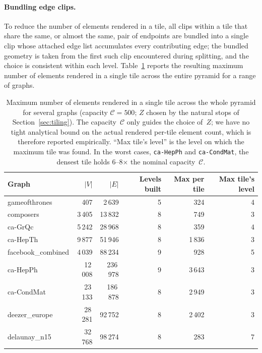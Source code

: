 \paragraph{Bundling edge clips.}
To reduce the number of elements rendered in a tile, all clips within
a tile that share the same, or almost the same, pair of endpoints are
bundled into a single clip whose attached edge list accumulates every
contributing edge; the bundled geometry is taken from the first such
clip encountered during splitting, and the choice is consistent within
each level. Table~\ref{tab:max-per-tile} reports the resulting maximum
number of elements rendered in a single tile across the entire pyramid
for a range of graphs.

\begin{table}[t]
\caption{Maximum number of elements rendered in a single tile across
  the whole pyramid for several graphs (capacity $\mathcal{C}=500$;
  $Z$ chosen by the natural stops of Section~\ref{sec:tiling}). The
  capacity~$\mathcal{C}$ only guides the choice of~$Z$; we have no
  tight analytical bound on the actual rendered per-tile element
  count, which is therefore reported empirically. ``Max tile's level''
  is the level on which the maximum tile was found. In the worst
  cases, \texttt{ca-HepPh} and \texttt{ca-CondMat}, the densest tile
  holds 6--8$\times$ the nominal capacity~$\mathcal{C}$.}
\label{tab:max-per-tile}
\centering
\begin{tabular}{lrrrrr}
\toprule
Graph & $|V|$ & $|E|$ & Levels built & Max per tile & Max tile's level \\
\midrule
gameofthrones      &     407 &   2\,639 & 5 &     324 & 4 \\
composers          &  3\,405 &  13\,832 & 8 &     749 & 3 \\
ca-GrQc            &  5\,242 &  28\,968 & 8 &     359 & 4 \\
ca-HepTh           &  9\,877 &  51\,946 & 8 &  1\,836 & 3 \\
facebook\_combined &  4\,039 &  88\,234 & 9 &     928 & 5 \\
ca-HepPh           & 12\,008 & 236\,978 & 9 &  3\,643 & 3 \\
ca-CondMat         & 23\,133 & 186\,878 & 8 &  2\,949 & 3 \\
deezer\_europe     & 28\,281 &  92\,752 & 8 &  2\,402 & 3 \\
delaunay\_n15      & 32\,768 &  98\,274 & 8 &     283 & 7 \\
\bottomrule
\end{tabular}
\end{table}

